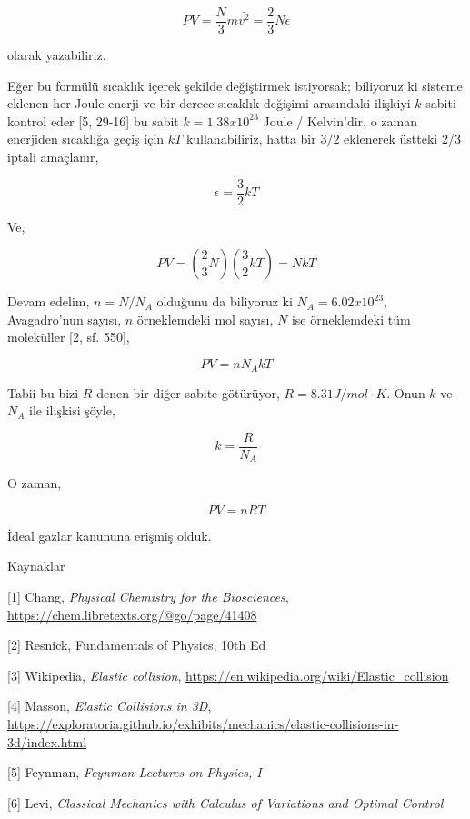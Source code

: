 \documentclass[12pt,fleqn]{article}\usepackage{../../common}
\begin{document}
$$
PV = \frac{N}{3} m \bar{v^2} = \frac{2}{3} N \epsilon
$$

olarak yazabiliriz.

Eğer bu formülü sıcaklık içerek şekilde değiştirmek istiyorsak; biliyoruz ki
sisteme eklenen her Joule enerji ve bir derece sıcaklık değişimi arasındaki
ilişkiyi $k$ sabiti kontrol eder [5, 29-16] bu sabit $k = 1.38 x 10^{23}$ Joule
/ Kelvin'dir, o zaman enerjiden sıcaklığa geçiş için $kT$ kullanabiliriz, hatta
bir $3/2$ eklenerek üstteki 2/3 iptali amaçlanır,

$$
\epsilon = \frac{3}{2} k T
$$

Ve,

$$
PV = \left( \frac{2}{3} N \right) \left( \frac{3}{2} k T \right) = N k T
$$

Devam edelim, $n = N / N_A$ olduğunu da biliyoruz ki $N_A = 6.02 x 10^{23}$,
Avagadro'nun sayısı, $n$ örneklemdeki mol sayısı, $N$ ise örneklemdeki tüm
moleküller [2, sf. 550],

$$
PV = n N_A k T
$$

Tabii bu bizi $R$ denen bir diğer sabite götürüyor, $R = 8.31 J/mol \cdot
K$. Onun $k$ ve $N_A$ ile ilişkisi şöyle,

$$
k = \frac{R}{N_A}
$$

O zaman,

$$
PV = n R T
$$

İdeal gazlar kanununa erişmiş olduk.


Kaynaklar

[1] Chang, {\em Physical Chemistry for the Biosciences},
    \url{https://chem.libretexts.org/@go/page/41408}

[2] Resnick, Fundamentals of Physics, 10th Ed

[3] Wikipedia, {\em Elastic collision}, \url{https://en.wikipedia.org/wiki/Elastic_collision}

[4] Masson, {\em Elastic Collisions in 3D}, \url{https://exploratoria.github.io/exhibits/mechanics/elastic-collisions-in-3d/index.html}

[5] Feynman, {\em Feynman Lectures on Physics, I}

[6] Levi, {\em Classical Mechanics with Calculus of Variations and Optimal Control}
\end{document}
